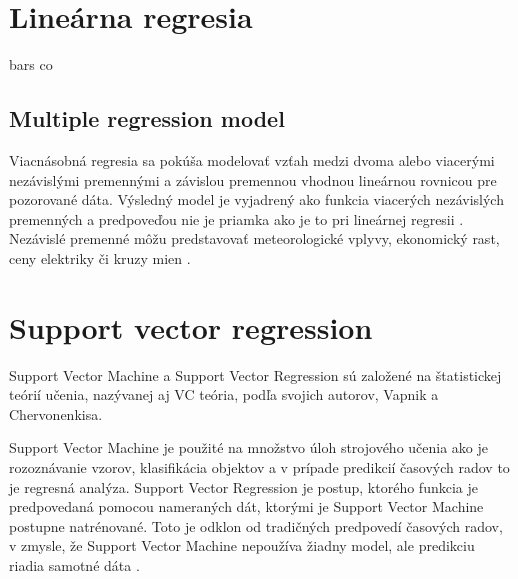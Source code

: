 \documentclass[12pt,oneside,slovak,a4paper]{book}
\begin{document}
\section{Lineárna regresia}
bars co

\subsection{Multiple regression model}
Viacnásobná regresia sa pokúša modelovať vzťah medzi dvoma alebo viacerými
nezávislými premennými a závislou premennou vhodnou lineárnou rovnicou pre
pozorované dáta. Výsledný model je vyjadrený ako funkcia viacerých nezávislých
premenných a predpoveďou nie je priamka ako je to pri lineárnej
regresii \cite{Grmanova2016}.
Nezávislé premenné môžu predstavovať meteorologické vplyvy, ekonomický rast,
ceny elektriky či kruzy mien \cite{KumarSingh2013}.

\section{Support vector regression}
Support Vector Machine a Support Vector Regression sú založené na štatistickej
teórií učenia, nazývanej aj VC teória, podľa svojich autorov, Vapnik
a Chervonenkisa.

Support Vector Machine je použité na množstvo úloh strojového učenia ako je
rozoznávanie vzorov, klasifikácia objektov a v prípade predikcií časových
radov to je regresná analýza. Support Vector Regression je postup, ktorého
funkcia je predpovedaná pomocou nameraných dát, ktorými je Support Vector
Machine postupne natrénované. Toto je odklon od tradičných predpovedí časových
radov, v zmysle, že Support Vector Machine nepoužíva žiadny model, ale
predikciu riadia samotné dáta \cite{Sapankevych2009}.

%

\end{document}
